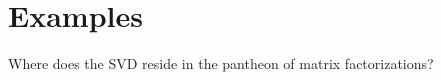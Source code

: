 \chapter{Examples}

Where does the SVD reside in the pantheon of matrix factorizations?

%
%



\endinput